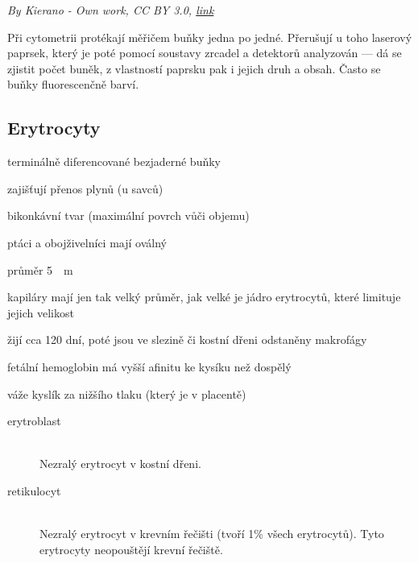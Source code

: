 \documentclass[DIV=8]{scrreprt}
\begin{document}
\emph{By Kierano - Own work, CC BY 3.0, \href{https://commons.wikimedia.org/w/index.php?curid=22102570}{link}}

Při cytometrii protékají měřičem buňky jedna po jedné. Přerušují u toho laserový paprsek, který je poté pomocí soustavy zrcadel a detektorů analyzován --- dá se zjistit počet buněk, z vlastností paprsku pak i jejich druh a obsah. Často se buňky fluorescenčně barví.

\subsection{Erytrocyty} \label{Erytrocyty}


\begin{myItemize}[nosep]
    \item terminálně diferencované bezjaderné buňky
    \item zajišťují přenos plynů (u savců)
    \item bikonkávní tvar (maximální povrch vůči objemu)
\begin{myItemize}[nosep]
    \item ptáci a obojživelníci mají oválný
\end{myItemize}

    \item průměr \si{5 \mu m}
\begin{myItemize}[nosep]
    \item kapiláry mají jen tak velký průměr, jak velké je jádro erytrocytů, které limituje jejich velikost
\end{myItemize}

    \item žijí cca 120 dní, poté jsou ve slezině či kostní dřeni odstaněny makrofágy
    \item fetální hemoglobin má vyšší afinitu ke kysíku než dospělý
\begin{myItemize}[nosep]
    \item váže kyslík za nižšího tlaku (který je v placentě)
\end{myItemize}

\end{myItemize}



\begin{description}
\item[erytroblast]\hfill \\
Nezralý erytrocyt v kostní dřeni.


\item[retikulocyt]\hfill \\
Nezralý erytrocyt v krevním řečišti (tvoří 1\% všech erytrocytů). Tyto erytrocyty neopouštějí krevní řečiště.

\end{description}
\end{document}
